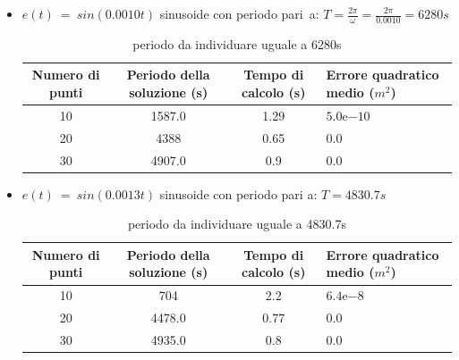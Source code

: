 \documentclass[a4paper,12pt]{report}
\newcommand{\expnumber}[2]{{#1}\mathrm{e}{#2}}
\begin{document}
\begin{itemize}
  \item $ e(t)~=~sin(0.0010t)$ sinusoide con periodo pari~a: $T = \frac{2\pi}{\omega} = \frac{2\pi}{0.0010} = 6280s$
  \begin{table}[H]
    \caption{periodo da individuare uguale a 6280s}
    \label{tab:fuori_stringente}
    \begin{center}
      \begin{tabularx}{\textwidth}{SSSp{0.5\textwidth}}
        \toprule
        {Numero di punti} & {Periodo della soluzione (s)} & {Tempo di calcolo (s)} & {Errore quadratico \newline medio ($m^2$)}\\
        \midrule
        10 &  1587.0  & 1.29 & $\expnumber{5.0}{-10}$\\
        20 &  4388 & 0.65 & $0.0$\\
        30 &  4907.0 & 0.9 & $0.0$ \\
        \bottomrule
      \end{tabularx}
    \end{center}
  \end{table}



  \item $ e(t)~=~sin(0.0013t)$ sinusoide con periodo pari a:
  $T = 4830.7s$
  \begin{table}[H]
    \caption{periodo da individuare uguale a 4830.7s}
    \label{tab:limiteSup_stringente}
    \begin{center}
      \begin{tabularx}{\textwidth}{SSSp{0.5\textwidth}}
        \toprule
        {Numero di punti} & {Periodo della soluzione (s)} & {Tempo di calcolo (s)} & {Errore quadratico \newline medio ($m^2$)}\\
        \midrule
        10 &  704  & 2.2 & $\expnumber{6.4}{-8}$\\
        20 &  4478.0 & 0.77 & $0.0$\\
        30 &  4935.0 & 0.8 & $0.0$\\
        \bottomrule
      \end{tabularx}
    \end{center}
  \end{table}


\end{itemize}
\end{document}
